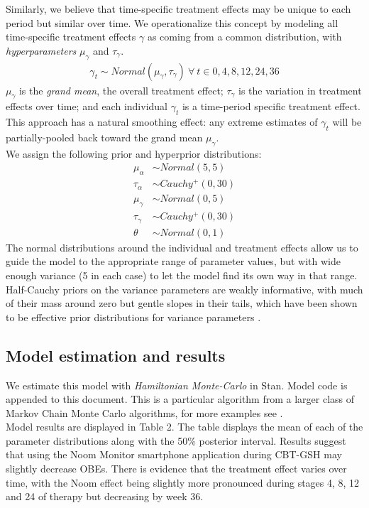 \documentclass{article}
\begin{document}
%
Similarly, we believe that time-specific treatment effects may be unique to each period but similar over time. We operationalize this concept by modeling all time-specific treatment effects $\gamma$ as coming from a common distribution, with \emph{hyperparameters} $\mu_{\gamma}$ and $\tau_{\gamma}$.
%
\begin{align}
\gamma_t \sim Normal(\mu_{\gamma}, \tau_{\gamma}) \ \forall \ t \in 0, 4, 8, 12, 24, 36
\end{align} 
%
$\mu_{\gamma}$ is the \emph{grand mean}, the overall treatment effect; $\tau_{\gamma}$ is the variation in treatment effects over time; and each individual $\gamma_t$ is a time-period specific treatment effect.  This approach has a natural smoothing effect: any extreme estimates of $\gamma_t$ will be partially-pooled back toward the grand mean $\mu_{\gamma}$.\\
%
We assign the following prior and hyperprior distributions:
\begin{align}
\mu_{\alpha} &\sim Normal(5, 5) \\
\tau_{\alpha} &\sim Cauchy^+(0, 30) \\
\mu_{\gamma} &\sim Normal(0, 5) \\
\tau_{\gamma} &\sim Cauchy^+(0, 30) \\
\theta &\sim Normal(0, 1)
\end{align}
%
The normal distributions around the individual and treatment effects allow us to guide the model to the appropriate range of parameter values, but with wide enough variance (5 in each case) to let the model find its own way in that range.  Half-Cauchy priors on the variance parameters are weakly informative, with much of their mass around zero but gentle slopes in their tails, which have been shown to be effective prior distributions for variance parameters \cite{gelman2006prior}.

\subsection{Model estimation and results}
We estimate this model with \emph{Hamiltonian Monte-Carlo} in Stan.  Model code is appended to this document. This is a particular algorithm from a larger class of Markov Chain Monte Carlo algorithms, for more examples see .\\
Model results are displayed in Table 2. The table displays the mean of each of the parameter distributions along with the 50\% posterior interval. Results suggest that using the Noom Monitor smartphone application during CBT-GSH may slightly decrease OBEs.  There is evidence that the treatment effect varies over time, with the Noom effect being slightly more pronounced during stages 4, 8, 12 and 24 of therapy but decreasing by week 36.
\end{document}
